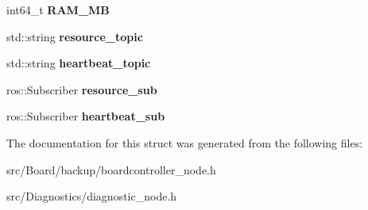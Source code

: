 \begin{DoxyCompactItemize}
int64\+\_\+t {\bfseries R\+A\+M\+\_\+\+MB}
\item 
\mbox{\label{structTask_af77e84ace6e5aa9b418533457b1fa3d9}} 
std\+::string {\bfseries resource\+\_\+topic}
\item 
\mbox{\label{structTask_a960bfb67cd85c80b78b7551784744c4c}} 
std\+::string {\bfseries heartbeat\+\_\+topic}
\item 
\mbox{\label{structTask_a576b111eeaf81987720ad743f51a8abd}} 
ros\+::\+Subscriber {\bfseries resource\+\_\+sub}
\item 
\mbox{\label{structTask_a774ebedc4b30e9d61431806e8c534f6a}} 
ros\+::\+Subscriber {\bfseries heartbeat\+\_\+sub}
\end{DoxyCompactItemize}


The documentation for this struct was generated from the following files\+:\begin{DoxyCompactItemize}
\item 
src/\+Board/backup/boardcontroller\+\_\+node.\+h\item 
src/\+Diagnostics/diagnostic\+\_\+node.\+h\end{DoxyCompactItemize}
